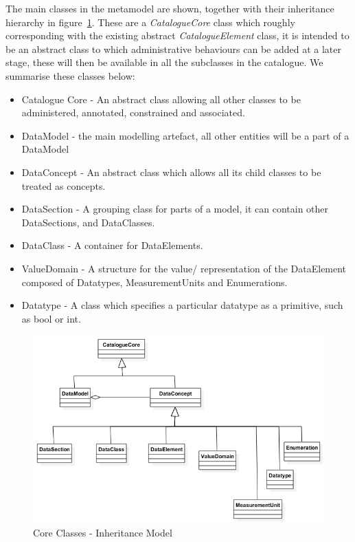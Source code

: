 \documentclass{article}
\begin{document}
The main classes in the metamodel are shown, together with their inheritance hierarchy in figure~\ref{fig:inheritance}. These are a \emph{CatalogueCore} class which roughly corresponding with the existing abstract \emph{CatalogueElement} class, it is intended to be an abstract class to which administrative behaviours can be added at a later stage, these will then be available in all the subclasses in the catalogue. We summarise these classes below:
\begin{itemize}
\item Catalogue Core - An abstract class allowing all other classes to be administered, annotated, constrained and associated.
\item DataModel - the main modelling artefact, all other entities will be a part of a DataModel
\item DataConcept - An abstract class which allows all its child classes to be treated as concepts.
\item DataSection - A grouping class for parts of a model, it can contain other DataSections, and DataClasses.
\item DataClass - A container for DataElements.
\item ValueDomain - A structure for the value/ representation of the DataElement composed of Datatypes, MeasurementUnits and Enumerations.
\item Datatype - A class which specifies a particular datatype as a primitive, such as bool or int.
\end{itemize}

 \begin{figure}[here]
\includegraphics[scale=0.4]{images/inheritance}
\caption{Core Classes - Inheritance Model} 
\label{fig:inheritance}
\end{figure}
\end{document}

